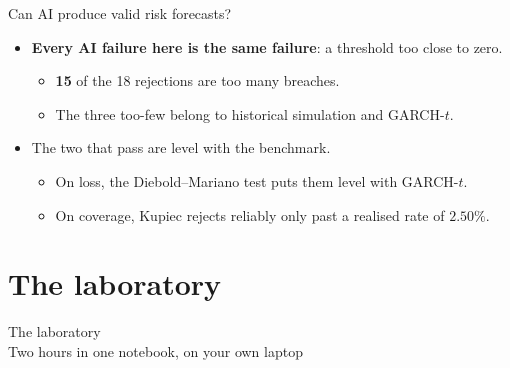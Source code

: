 \documentclass[9pt, aspectratio=169, t]{beamer}
\newcommand{\cred}[1]{\textcolor{FigRed}{\textbf{#1}}}
\begin{document}
\begin{frame}{Can AI produce valid risk forecasts?}
\begin{itemize}
    \item \cred{Every AI failure here is the same failure}: a threshold too close to zero.
      \begin{itemize}
        \item \textbf{15} of the 18 rejections are too many breaches. 
        \item The three too-few
              belong to historical simulation and GARCH-$t$.
      \end{itemize}
    \item The two that pass are level with the benchmark.
      \begin{itemize}
        \item On loss, the Diebold--Mariano test puts them level with GARCH-$t$.
        \item On coverage, Kupiec rejects reliably only past a realised rate of $2.50\%$.
      \end{itemize}
  \end{itemize}
\end{frame}
\section{The laboratory}
\begin{frame}[plain]
  \centering\vfill
  {\Large\textcolor{IDAred}{The laboratory}}\\[0.4em]
  {\large Two hours in one notebook, on your own laptop}
  \vfill
\end{frame}
\end{document}
